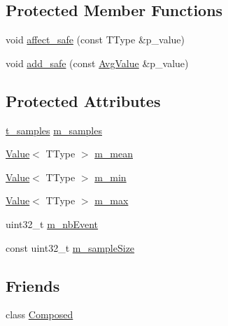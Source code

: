 \subsection*{Protected Member Functions}
\begin{DoxyCompactItemize}
\item 
void \hyperlink{classxtd_1_1counters_1_1AvgValue_a3ad3008fc30f1936e8dd1eef1d62f324}{affect\+\_\+safe} (const T\+Type \&p\+\_\+value)
\item 
void \hyperlink{classxtd_1_1counters_1_1AvgValue_ad0532ed35af8242fabd3a910cc88c543}{add\+\_\+safe} (const \hyperlink{classxtd_1_1counters_1_1AvgValue}{Avg\+Value} \&p\+\_\+value)
\end{DoxyCompactItemize}
\subsection*{Protected Attributes}
\begin{DoxyCompactItemize}
\item 
\hyperlink{classxtd_1_1counters_1_1AvgValue_aa58af8a852f52342b087373414e61878}{t\+\_\+samples} \hyperlink{classxtd_1_1counters_1_1AvgValue_a787afb6a601eb29f48a0fd247524cf84}{m\+\_\+samples}
\item 
\hyperlink{classxtd_1_1counters_1_1Value}{Value}$<$ T\+Type $>$ \hyperlink{classxtd_1_1counters_1_1AvgValue_afa1908ab38d3deef50e1169b1cc20f6c}{m\+\_\+mean}
\item 
\hyperlink{classxtd_1_1counters_1_1Value}{Value}$<$ T\+Type $>$ \hyperlink{classxtd_1_1counters_1_1AvgValue_a8e217891d937894812b5edfcf6a5ce0e}{m\+\_\+min}
\item 
\hyperlink{classxtd_1_1counters_1_1Value}{Value}$<$ T\+Type $>$ \hyperlink{classxtd_1_1counters_1_1AvgValue_a9ee9567a0a95cf6b579c13329f21f0d5}{m\+\_\+max}
\item 
uint32\+\_\+t \hyperlink{classxtd_1_1counters_1_1AvgValue_aba4c4022706bda9bfdedea3cb9c3647a}{m\+\_\+nb\+Event}
\item 
const uint32\+\_\+t \hyperlink{classxtd_1_1counters_1_1AvgValue_a85edafd4829b5aa5be6562cadd8e4764}{m\+\_\+sample\+Size}
\end{DoxyCompactItemize}
\subsection*{Friends}
\begin{DoxyCompactItemize}
\item 
class \hyperlink{classxtd_1_1counters_1_1AvgValue_a93e934ad70d5b32b14beed5572450abf}{Composed}
\end{DoxyCompactItemize}


